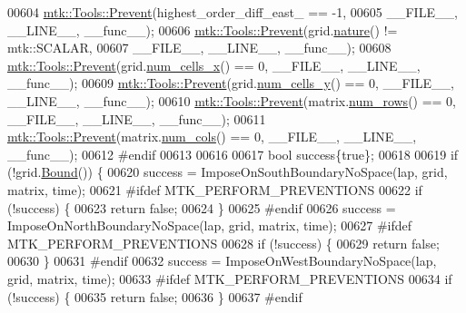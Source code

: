 \begin{DoxyCode}
00604   \hyperlink{classmtk_1_1Tools_a332324c6f25e66be9dff48c5987a3b9f}{mtk::Tools::Prevent}(highest\_order\_diff\_east\_ == -1,
00605                       \_\_FILE\_\_, \_\_LINE\_\_, \_\_func\_\_);
00606   \hyperlink{classmtk_1_1Tools_a332324c6f25e66be9dff48c5987a3b9f}{mtk::Tools::Prevent}(grid.\hyperlink{classmtk_1_1UniStgGrid2D_a99a3a9cdb05b7306be99bde935509e30}{nature}() != mtk::SCALAR,
00607                       \_\_FILE\_\_, \_\_LINE\_\_, \_\_func\_\_);
00608   \hyperlink{classmtk_1_1Tools_a332324c6f25e66be9dff48c5987a3b9f}{mtk::Tools::Prevent}(grid.\hyperlink{classmtk_1_1UniStgGrid2D_a2d182866a398aba8e4829590e85bf939}{num\_cells\_x}() == 0, \_\_FILE\_\_, \_\_LINE\_\_, \_\_func\_\_);
00609   \hyperlink{classmtk_1_1Tools_a332324c6f25e66be9dff48c5987a3b9f}{mtk::Tools::Prevent}(grid.\hyperlink{classmtk_1_1UniStgGrid2D_aed05a801cc9a76dba0ff203cea58a61a}{num\_cells\_y}() == 0, \_\_FILE\_\_, \_\_LINE\_\_, \_\_func\_\_);
00610   \hyperlink{classmtk_1_1Tools_a332324c6f25e66be9dff48c5987a3b9f}{mtk::Tools::Prevent}(matrix.\hyperlink{classmtk_1_1DenseMatrix_a53f3afb3b6a8d21854458aaa9663cc74}{num\_rows}() == 0, \_\_FILE\_\_, \_\_LINE\_\_, \_\_func\_\_);
00611   \hyperlink{classmtk_1_1Tools_a332324c6f25e66be9dff48c5987a3b9f}{mtk::Tools::Prevent}(matrix.\hyperlink{classmtk_1_1DenseMatrix_a41747502d468c6728a4be31501b16e0e}{num\_cols}() == 0, \_\_FILE\_\_, \_\_LINE\_\_, \_\_func\_\_);
00612 \textcolor{preprocessor}{  #endif}
00613 
00616 
00617   \textcolor{keywordtype}{bool} success\{\textcolor{keyword}{true}\};
00618 
00619   \textcolor{keywordflow}{if} (!grid.\hyperlink{classmtk_1_1UniStgGrid2D_aa651194ccd0321a7c61a8f56fa5e8455}{Bound}()) \{
00620     success = ImposeOnSouthBoundaryNoSpace(lap, grid, matrix, time);
00621 \textcolor{preprocessor}{    #ifdef MTK\_PERFORM\_PREVENTIONS}
00622     \textcolor{keywordflow}{if} (!success) \{
00623       \textcolor{keywordflow}{return} \textcolor{keyword}{false};
00624     \}
00625 \textcolor{preprocessor}{    #endif}
00626     success = ImposeOnNorthBoundaryNoSpace(lap, grid, matrix, time);
00627 \textcolor{preprocessor}{    #ifdef MTK\_PERFORM\_PREVENTIONS}
00628     \textcolor{keywordflow}{if} (!success) \{
00629       \textcolor{keywordflow}{return} \textcolor{keyword}{false};
00630     \}
00631 \textcolor{preprocessor}{    #endif}
00632     success = ImposeOnWestBoundaryNoSpace(lap, grid, matrix, time);
00633 \textcolor{preprocessor}{    #ifdef MTK\_PERFORM\_PREVENTIONS}
00634     \textcolor{keywordflow}{if} (!success) \{
00635       \textcolor{keywordflow}{return} \textcolor{keyword}{false};
00636     \}
00637 \textcolor{preprocessor}{    #endif}

\end{DoxyCode}
